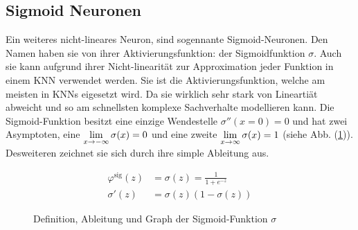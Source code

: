 \subsection{Sigmoid Neuronen}
Ein weiteres nicht-lineares Neuron, sind sogennante Sigmoid-Neuronen.
Den Namen haben sie von ihrer Aktivierungsfunktion: der Sigmoidfunktion $\sigma$.
\para{}
Auch sie kann aufgrund ihrer Nicht-linearität zur Approximation jeder Funktion
in einem KNN verwendet werden. Sie ist die Aktivierungsfunktion, welche am
meisten in KNNs eigesetzt wird. Da sie wirklich sehr stark von Lineartiät
abweicht und so am schnellsten komplexe Sachverhalte modellieren kann.
\para{}
Die Sigmoid-Funktion besitzt eine einzige Wendestelle $\sigma''(x=0)=0$ und hat
zwei Asymptoten, eine $\displaystyle\lim_{x \to -\infty} \sigma(x)=0$
und eine zweite $\displaystyle\lim_{x \to \infty} \sigma(x)=1$ (siehe Abb.
(\ref{fig:sigmoid})). Desweiteren zeichnet sie sich durch ihre simple Ableitung aus.
\\
\begin{figure}[h!]
  \begin{minipage}[h!]{0.5\textwidth}
    \begin{align*}
      \varphi^{\text{sig}}(z) &= \sigma(z) = \frac{1}{1 + e^{-z}}\\
      \sigma'(z)&=\sigma(z)(1-\sigma(z))
    \end{align*}
  \end{minipage}
  \begin{minipage}[h!]{0.5\textwidth}
    \centering
  \end{minipage}
  \caption{Definition, Ableitung und Graph der Sigmoid-Funktion $\sigma$}
  \label{fig:sigmoid}
\end{figure}

